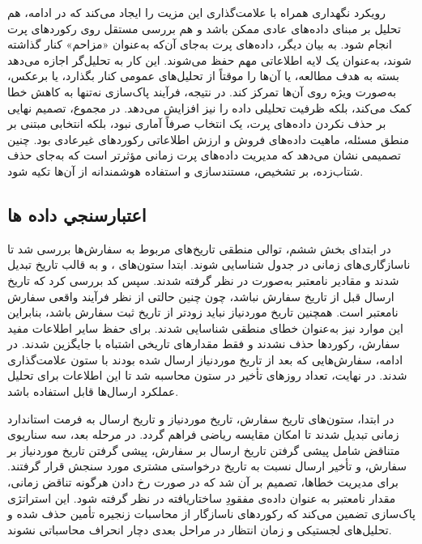 \documentclass[14pt,a4paper]{extarticle}
\begin{document}
	رویکرد نگهداری همراه با علامت‌گذاری این مزیت را ایجاد می‌کند که در ادامه، هم تحلیل بر مبنای داده‌های عادی ممکن باشد و هم بررسی مستقل روی رکوردهای پرت انجام شود. به بیان دیگر، داده‌های پرت به‌جای آن‌که به‌عنوان «مزاحم» کنار گذاشته شوند، به‌عنوان یک لایه اطلاعاتی مهم حفظ می‌شوند. این کار به تحلیل‌گر اجازه می‌دهد بسته به هدف مطالعه، یا آن‌ها را موقتاً از تحلیل‌های عمومی کنار بگذارد، یا برعکس، به‌صورت ویژه روی آن‌ها تمرکز کند. در نتیجه، فرآیند پاک‌سازی نه‌تنها به کاهش خطا کمک می‌کند، بلکه ظرفیت تحلیلی داده را نیز افزایش می‌دهد. در مجموع، تصمیم نهایی بر حذف نکردن داده‌های پرت، یک انتخاب صرفاً آماری نبود، بلکه انتخابی مبتنی بر منطق مسئله، ماهیت داده‌های فروش و ارزش اطلاعاتی رکوردهای غیرعادی بود. چنین تصمیمی نشان می‌دهد که مدیریت داده‌های پرت زمانی مؤثرتر است که به‌جای حذف شتاب‌زده، بر تشخیص، مستندسازی و استفاده هوشمندانه از آن‌ها تکیه شود.
	
	\subsection{ﺍﻋﺘﺒﺎﺭﺳﻨﺠﻲ ﺩﺍﺩﻩ ﻫﺎ}
	
	در ابتدای بخش ششم، توالی منطقی تاریخ‌های مربوط به سفارش‌ها بررسی شد تا ناسازگاری‌های زمانی در جدول  شناسایی شوند. ابتدا ستون‌های ،  و  به قالب تاریخ تبدیل شدند و مقادیر نامعتبر به‌صورت  در نظر گرفته شدند. سپس کد بررسی کرد که تاریخ ارسال قبل از تاریخ سفارش نباشد، چون چنین حالتی از نظر فرآیند واقعی سفارش نامعتبر است. همچنین تاریخ موردنیاز نباید زودتر از تاریخ ثبت سفارش باشد، بنابراین این موارد نیز به‌عنوان خطای منطقی شناسایی شدند. برای حفظ سایر اطلاعات مفید سفارش، رکوردها حذف نشدند و فقط مقدارهای تاریخی اشتباه با  جایگزین شدند. در ادامه، سفارش‌هایی که بعد از تاریخ موردنیاز ارسال شده بودند با ستون  علامت‌گذاری شدند. در نهایت، تعداد روزهای تأخیر در ستون  محاسبه شد تا این اطلاعات برای تحلیل عملکرد ارسال‌ها قابل استفاده باشد.
	
	در ابتدا، ستون‌های تاریخ سفارش، تاریخ موردنیاز و تاریخ ارسال به فرمت استاندارد زمانی تبدیل شدند تا امکان مقایسه ریاضی فراهم گردد. در مرحله بعد، سه سناریوی متناقض شامل پیشی گرفتن تاریخ ارسال بر سفارش، پیشی گرفتن تاریخ موردنیاز بر سفارش، و تأخیر ارسال نسبت به تاریخ درخواستی مشتری مورد سنجش قرار گرفتند. برای مدیریت خطاها، تصمیم بر آن شد که در صورت رخ دادن هرگونه تناقض زمانی، مقدار نامعتبر به عنوان داده‌ی مفقودِ ساختاریافته در نظر گرفته شود. این استراتژی پاک‌سازی تضمین می‌کند که رکوردهای ناسازگار از محاسبات زنجیره تأمین حذف شده و تحلیل‌های لجستیکی و زمان انتظار در مراحل بعدی دچار انحراف محاسباتی نشوند.
	
\end{document}
